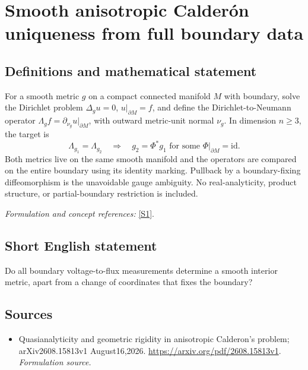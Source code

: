 \documentclass[11pt]{article}
\begin{document}
\section*{\texorpdfstring{Smooth anisotropic Calderón uniqueness from full boundary data}{Smooth anisotropic Calderón uniqueness from full boundary data}}\label{176}
\subsection{Definitions and mathematical statement}
For a smooth metric $g$ on a compact connected manifold $M$ with boundary, solve the Dirichlet problem $\Delta_g u=0$, $u|_{\partial M}=f$, and define the Dirichlet-to-Neumann operator
$\Lambda_g f=\partial_{\nu_g}u|_{\partial M}$, with outward metric-unit normal $\nu_g$. In dimension $n\ge3$, the target is
\[
 \Lambda_{g_1}=\Lambda_{g_2}\quad\Longrightarrow\quad
 g_2=\Phi^*g_1\text{ for some }\Phi|_{\partial M}=\mathrm{id}.
\]
Both metrics live on the same smooth manifold and the operators are compared on the entire boundary using its identity marking. Pullback by a boundary-fixing diffeomorphism is the unavoidable gauge ambiguity. No real-analyticity, product structure, or partial-boundary restriction is included.
\par\smallskip\textit{Formulation and concept references:} \href{https://arxiv.org/pdf/2608.15813v1}{[S1]}.

\subsection{Short English statement}
Do all boundary voltage-to-flux measurements determine a smooth interior metric, apart from a change of coordinates that fixes the boundary?
\subsection{Sources}
\begin{itemize}
\item[S1]Quasianalyticity and geometric rigidity in anisotropic Calderon's problem; arXiv2608.15813v1 August16,2026.
\url{https://arxiv.org/pdf/2608.15813v1}.
\textit{Formulation source.}
\end{itemize}
\end{document}
